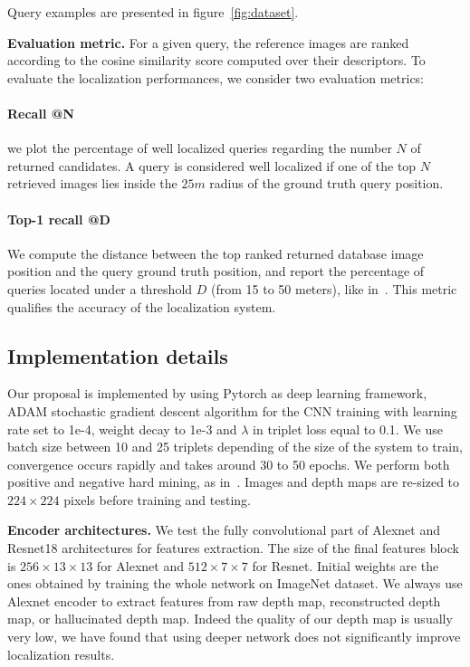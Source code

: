 \noindent Query examples are presented in figure~\ref{fig:dataset}.
	
\vspace{4pt}\noindent\textbf{Evaluation metric.} For a given query, the reference images are ranked according to the cosine similarity score computed over their descriptors. To evaluate the localization performances, we consider two evaluation metrics:
	\setcounter{paragraph}{0}

	\paragraph{Recall @N} we plot the percentage of well localized queries regarding the number $N$ of returned candidates. A query is considered well localized if one of the top $N$ retrieved images lies inside the $25m$ radius of the ground truth query position.
	\paragraph{Top-1 recall @D} We compute the distance between the top ranked returned database image position and the query ground truth position, and report the percentage of queries located under a threshold $D$ (from 15 to 50 meters), like in~\cite{Zamir2014}. This metric qualifies the accuracy of the localization system.

\subsection{Implementation details}
\label{subsec:implementation}

Our proposal is implemented by using Pytorch as deep learning framework, ADAM stochastic gradient descent algorithm for the CNN training with learning rate set to 1e-4, weight decay to 1e-3 and $\lambda$ in triplet loss equal to 0.1. We use batch size between 10 and 25 triplets depending of the size of the system to train, convergence occurs rapidly and takes around 30 to 50 epochs. We perform both positive and negative hard mining, as in~\cite{Radenovic2017}. Images and depth maps are re-sized to $224\times224$ pixels before training and testing.

\vspace{4pt}\noindent\textbf{Encoder architectures.} We test the fully convolutional part of Alexnet and Resnet18 architectures for features extraction. The size of the final features block is $256\times13\times13$ for Alexnet and $512\times7\times7$ for Resnet. Initial weights are the ones obtained by training the whole network on ImageNet dataset. We always use Alexnet encoder to extract features from raw depth map, reconstructed depth map, or hallucinated depth map. Indeed the quality of our depth map is usually very low, we have found that using deeper network does not significantly improve localization results.

